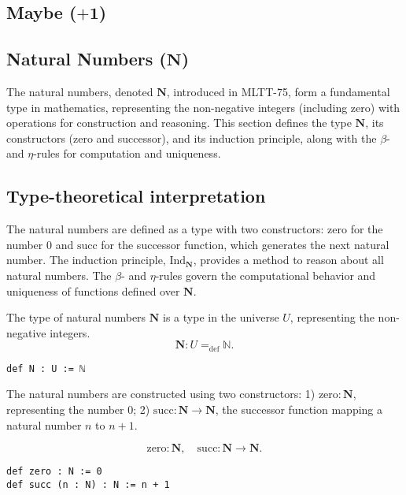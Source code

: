 \documentclass{article}
\begin{document}
\subsection{Maybe (\(\mathbf{+1}\))}

\newpage

\subsection{Natural Numbers (\(\mathbf{N}\))}

The natural numbers, denoted $\mathbf{N}$, introduced in MLTT-75, form a fundamental type in mathematics,
representing the non-negative integers (including zero) with operations
for construction and reasoning. This section defines the type $\mathbf{N}$,
its constructors (zero and successor), and its induction principle, along
with the $\beta$- and $\eta$-rules for computation and uniqueness.

\subsection*{Type-theoretical interpretation}

The natural numbers are defined as a type with two constructors: $\mathrm{zero}$ for the number 0 and $\mathrm{succ}$ for the successor function, which generates the next natural number. The induction principle, $\mathrm{Ind}_\mathbf{N}$, provides a method to reason about all natural numbers. The $\beta$- and $\eta$-rules govern the computational behavior and uniqueness of functions defined over $\mathbf{N}$.

\begin{definition}
The type of natural numbers $\mathbf{N}$ is a type in the universe $U$, representing the non-negative integers.
\[
\mathbf{N} : U =_{\text{def}} \mathbb{N}.
\]
\begin{lstlisting}[mathescape=true]
def N : U := ℕ
\end{lstlisting}
\end{definition}

\begin{definition}
The natural numbers are constructed using two constructors:
1) $\mathrm{zero} : \mathbf{N}$, representing the number 0;
2) $\mathrm{succ} : \mathbf{N} \rightarrow \mathbf{N}$,
   the successor function mapping a natural number $n$ to $n+1$.

\[
\mathrm{zero} : \mathbf{N}, \quad \mathrm{succ} : \mathbf{N} \rightarrow \mathbf{N}.
\]

\begin{lstlisting}[mathescape=true]
def zero : N := 0
def succ (n : N) : N := n + 1
\end{lstlisting}
\end{definition}
\end{document}
